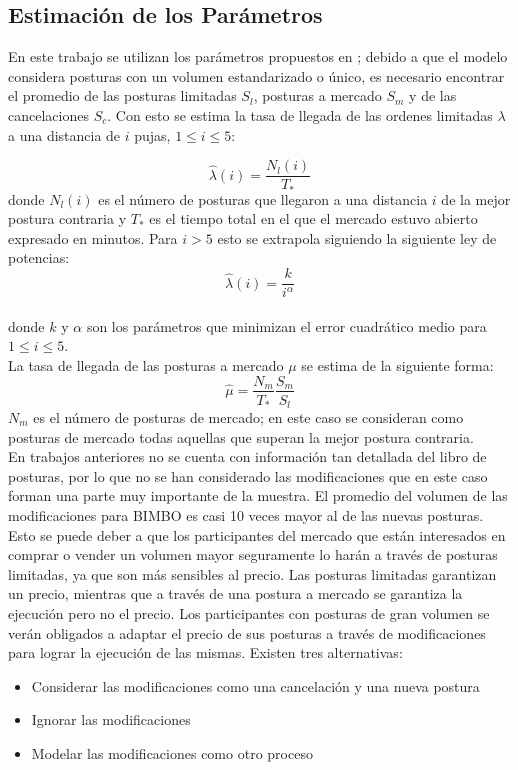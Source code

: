 \documentclass[11pt]{article}
\numberwithin{equation}{section} %
\begin{document}
\clearpage

\subsection{Estimación de los Parámetros}

En este trabajo se utilizan los parámetros propuestos en \cite{Cont2010}; debido a que el modelo considera posturas con un volumen estandarizado o único, es necesario encontrar el promedio de las posturas limitadas $S_l$, posturas a mercado $S_m$ y de las cancelaciones $S_c$. Con esto se estima la tasa de llegada de las ordenes limitadas $\lambda$ a una distancia de $i$ pujas, $1\leq i \leq 5$:

\[
\hat{\lambda}(i)=\frac{N_l(i)}{T_*}
\]
donde $N_l(i)$ es el número de posturas que llegaron a una distancia $i$ de la mejor postura contraria y $T_*$ es el tiempo total en el que el mercado estuvo abierto expresado en minutos. Para $i>5$ esto se extrapola siguiendo la siguiente ley de potencias:
\[
\hat{\lambda}(i)=\frac{k}{i^\alpha}
\]\\
donde $k$ y $\alpha$ son los parámetros que minimizan el error cuadrático medio para $1\leq i \leq 5$.\\

La tasa de llegada de las posturas a mercado $\mu$ se estima de la siguiente forma:
\[
\hat{\mu}=\frac{N_m}{T_*}\frac{S_m}{S_l}
\]
$N_m$ es el número de posturas de mercado; en este caso se consideran como posturas de mercado todas aquellas que superan la mejor postura contraria.\\

En trabajos anteriores no se cuenta con información tan detallada del libro de posturas, por lo que no se han considerado las modificaciones que en este caso forman una parte muy importante de la muestra. El promedio del volumen de las modificaciones para BIMBO es casi 10 veces mayor al de las nuevas posturas. Esto se puede deber a que los participantes del mercado que están interesados en comprar o vender un volumen mayor seguramente lo harán a través de posturas limitadas, ya que son más sensibles al precio. Las posturas limitadas garantizan un precio, mientras que a través de una postura a mercado se garantiza la ejecución pero no el precio. Los participantes con posturas de gran volumen se verán obligados a adaptar el precio de sus posturas a través de modificaciones para lograr la ejecución de las mismas. Existen tres alternativas:
\begin{itemize}
  \item Considerar las modificaciones como una cancelación y una nueva postura
  \item Ignorar las modificaciones
  \item Modelar las modificaciones como otro proceso\\
\end{itemize}
\end{document}
